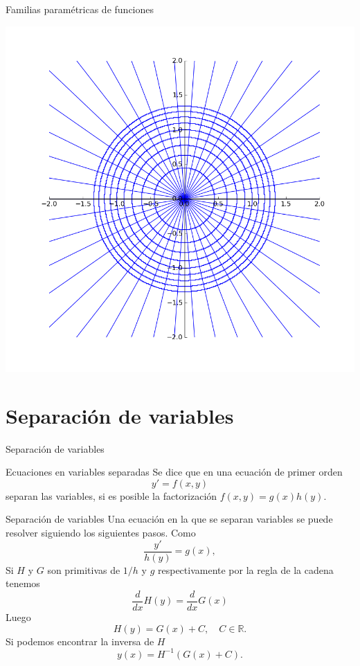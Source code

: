 \documentclass[handout,hyperref={colorlinks=true}]{beamer}
\newcommand{\rr}{\mathbb{R}}
\begin{document}
\begin{frame}[fragile]{Familias paramétricas de funciones} 
\begin{center}
\includegraphics[scale=.3]{imagenes/flia_curvas_ortogonales.png}
\end{center}
\end{frame}




\section{Separación de variables}
\begin{frame}{Separación de variables}
\begin{block}{Ecuaciones en variables separadas} Se dice que en una ecuación de primer orden
 \[y'=f(x,y)\]
 separan las variables, si es posible la factorización $f(x,y)=g(x)h(y)$.
 \end{block}



\end{frame}

\begin{frame}{Separación de variables} 
Una ecuación  en la que se separan variables se puede resolver siguiendo los siguientes pasos. Como
\[\frac{y'}{h(y)}=g(x),\]
Si $H$ y $G$ son primitivas de $1/h$ y $g$ respectivamente por la regla de la cadena tenemos
\[\frac{d}{dx}H(y)=\frac{d}{dx}G(x)\]
Luego 
\[H(y)=G(x)+C,\quad C\in\rr.\]
Si podemos encontrar la inversa de $H$
\[y(x)=H^{-1}\left(G(x)+C\right).\]


\end{frame}
\end{document}
